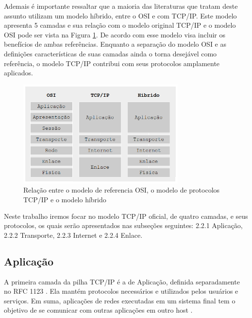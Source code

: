 Ademais é importante ressaltar que a maioria das literaturas que tratam deste assunto utilizam um modelo híbrido, entre o OSI e com TCP/IP. Este modelo apresenta 5 camadas e sua relação com o modelo original TCP/IP e o modelo OSI pode ser vista na Figura \ref{fig:tresmodelos}. De acordo com \cite{TANENBAUM} esse modelo visa incluir os benefícios de ambas referências. Enquanto a separaç\~ao do modelo OSI e as definições caracter\'isticas de suas camadas ainda o torna desej\'avel como referência, o modelo TCP/IP contribui com seus protocolos amplamente aplicados.

\begin{figure}[H]
	\centering
    \includegraphics[width=0.75\textwidth]{04-figuras/tresmodelos.png}
    \caption{Relação entre o modelo de referencia OSI, o modelo de protocolos TCP/IP e o modelo híbrido}
    \label{fig:tresmodelos}
\end{figure} 

Neste trabalho iremos focar no modelo TCP/IP oficial, de quatro camadas, e seus protocolos, os quais serão apresentados nas subseções seguintes: 2.2.1 Aplicação, 2.2.2 Transporte, 2.2.3 Internet e 2.2.4 Enlace. 

\subsection{Aplicação}

A primeira camada da pilha TCP/IP é a de Aplicação, definida separadamente no RFC 1123 \cite{RFC1123}. Ela mantém protocolos necessários e utilizados pelos usuários e serviços. Em suma, aplicações de redes executadas em um sistema final tem o objetivo de se comunicar com outras aplicações  em outro host \cite{KUROSE}.

